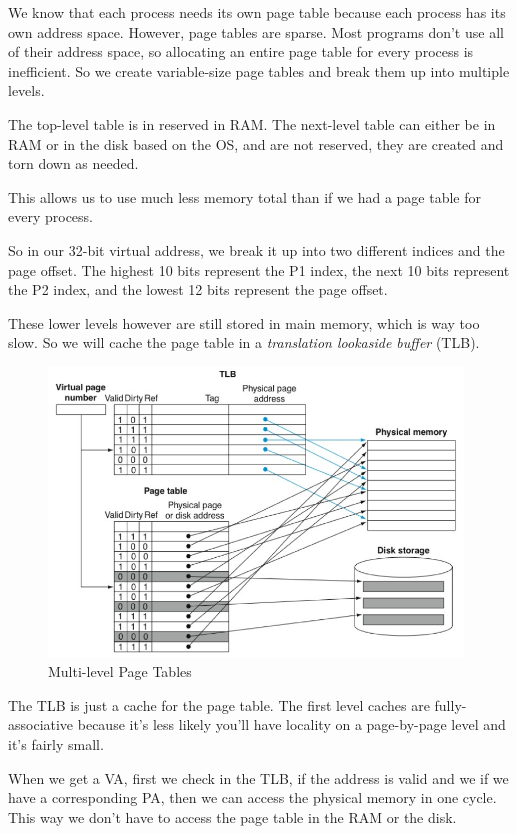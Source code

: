 \documentclass{article}
\begin{document}
We know that each process needs its own page table because each process has its own address space. However, page tables are sparse. Most programs don't use all of their address space, so allocating an entire page table for every process is inefficient. So we create variable-size page tables and break them up into multiple levels.



The top-level table is in reserved in RAM. The next-level table can either be in RAM or in the disk based on the OS, and are not reserved, they are created and torn down as needed. 

This allows us to use much less memory total than if we had a page table for every process. 

So in our 32-bit virtual address, we break it up into two different indices and the page offset. The highest 10 bits represent the P1 index, the next 10 bits represent the P2 index, and the lowest 12 bits represent the page offset. 

These lower levels however are still stored in main memory, which is way too slow. So we will cache the page table in a \textit{translation lookaside buffer} (TLB). 

\begin{figure}[ht!]
\centering
\includegraphics[width=110mm]{img/lookaside.png}
\caption{Multi-level Page Tables}
\end{figure}

The TLB is just a cache for the page table. The first level caches are fully-associative because it's less likely you'll have locality on a page-by-page level and it's fairly small. 

When we get a VA, first we check in the TLB, if the address is valid and we if we have a corresponding PA, then we can access the physical memory in one cycle. This way we don't have to access the page table in the RAM or the disk. 
\end{document}
